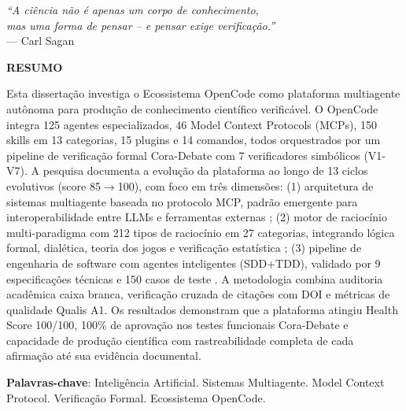 \documentclass[12pt,a4paper,sumario=tradicional]{abntex2}
\begin{document}
\newpage
\thispagestyle{empty}
\vspace*{12cm}
\begin{flushright}
\textit{``A ciência não é apenas um corpo de conhecimento,}\\
\textit{mas uma forma de pensar -- e pensar exige verificação.''}\\[0.5cm]
--- Carl Sagan
\end{flushright}

\newpage
\begin{center}
\textbf{RESUMO}
\end{center}

Esta dissertação investiga o Ecossistema OpenCode como plataforma multiagente autônoma para produção de conhecimento científico verificável. O OpenCode integra 125 agentes especializados, 46 Model Context Protocols (MCPs), 150 skills em 13 categorias, 15 plugins e 14 comandos, todos orquestrados por um pipeline de verificação formal Cora-Debate com 7 verificadores simbólicos (V1-V7). A pesquisa documenta a evolução da plataforma ao longo de 13 ciclos evolutivos (score 85$\rightarrow$100), com foco em três dimensões: (1) arquitetura de sistemas multiagente baseada no protocolo MCP, padrão emergente para interoperabilidade entre LLMs e ferramentas externas \cite{ayyagari2025mcp, lei2026survey}; (2) motor de raciocínio multi-paradigma com 212 tipos de raciocínio em 27 categorias, integrando lógica formal, dialética, teoria dos jogos e verificação estatística \cite{antero2024harnessing, xu2026optimisation}; (3) pipeline de engenharia de software com agentes inteligentes (SDD+TDD), validado por 9 especificações técnicas e 150 casos de teste \cite{garfinkel2026acm, rasheed2026llm}. A metodologia combina auditoria acadêmica caixa branca, verificação cruzada de citações com DOI e métricas de qualidade Qualis A1. Os resultados demonstram que a plataforma atingiu Health Score 100/100, 100\% de aprovação nos testes funcionais Cora-Debate e capacidade de produção científica com rastreabilidade completa de cada afirmação até sua evidência documental.

\vspace{0.5cm}
\textbf{Palavras-chave}: Inteligência Artificial. Sistemas Multiagente. Model Context Protocol. Verificação Formal. Ecossistema OpenCode.
\end{document}

